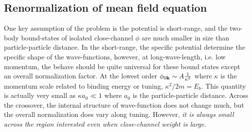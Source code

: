  
\subsection {Renormalization of mean field equation}
One key assumption of the problem is the potential is short-range, and the two-body bound-states of isolated close-channel $\phi$ are much smaller in size than particle-particle distance.  In the short-range, the specific potential determine the specific shape of the wave-functions, however, at long-wave-length, i.e. low momentum, the behave should be quite universal for these bound states except an overall normalization factor.  At the lowest order $\phi_{0\mathbf{k}}\sim{A}\frac{1}{\kappa^{2}}$ where $\kappa$ is the momentum scale related to binding energy or tuning, $\kappa^{2}/2m=E_{b}$.  This quantity is actually very small as $\kappa{}a_{0}\ll1$ where $a_{0}$ is the particle-particle distance.  Across the crossover, the internal structure of wave-function does not change much, but the overall normalization does vary along tuning.  However, \emph{it is always small across the region interested even when close-channel weight is large.} 
 
